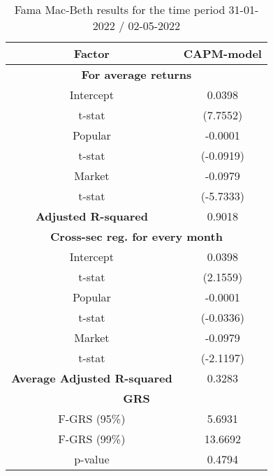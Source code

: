 \begin{table}[h!]
	\centering
	\captionsetup{skip=0.5\baselineskip}
	\caption{Fama Mac-Beth results for the time period 31-01-2022 / 02-05-2022}
	\begin{tabular}{|c|c|}
		\hline
		\textbf{Factor} & \textbf{CAPM-model} \\ \hline
		\multicolumn{2}{|c|}{\textbf{For average returns}} \\ \hline
		Intercept & 0.0398 \\ 
		t-stat & (7.7552) \\ \hline
		Popular & -0.0001 \\ 
		t-stat & (-0.0919)\\ \hline
		Market & -0.0979 \\
		t-stat & (-5.7333)\\ \hline
		\textbf{Adjusted R-squared} & 0.9018 \\ \hline
		\multicolumn{2}{|c|}{\textbf{Cross-sec reg. for every month}} \\ \hline
		Intercept & 0.0398 \\ 
		t-stat & (2.1559) \\ \hline
		Popular & -0.0001 \\ 
		t-stat & (-0.0336)\\ \hline
		Market & -0.0979 \\
		t-stat & (-2.1197)\\ \hline
		\textbf{Average Adjusted R-squared} & 0.3283 \\ \hline
		\multicolumn{2}{|c|}{\textbf{GRS}} \\ \hline
		F-GRS (95\%) & 5.6931 \\ \hline
		F-GRS (99\%) & 13.6692 \\ \hline
		p-value & 0.4794 \\ \hline
	\end{tabular}
\end{table}
